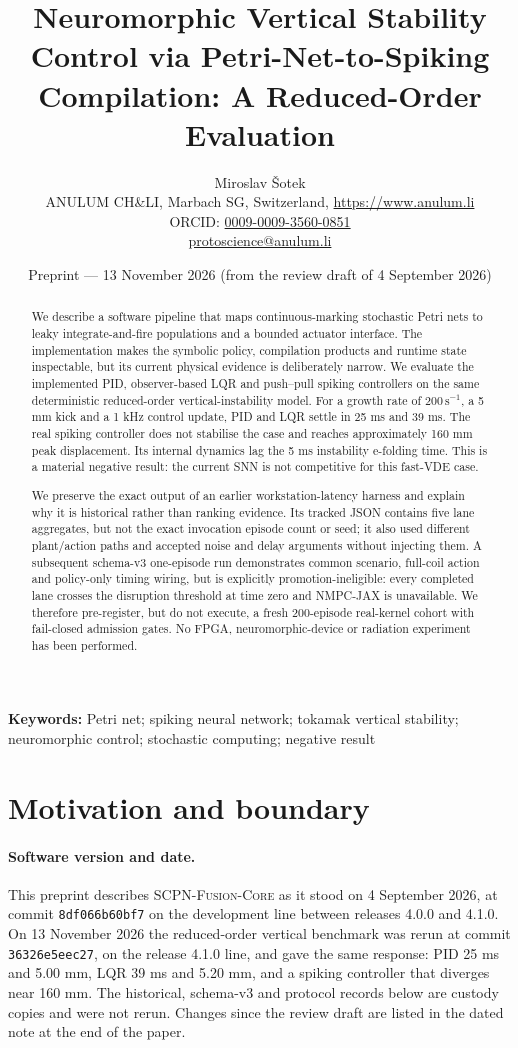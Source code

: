 \documentclass[11pt]{article}
\title{Neuromorphic Vertical Stability Control via Petri-Net-to-Spiking\\
Compilation: A Reduced-Order Evaluation}
\author{Miroslav \v{S}otek\\
\small ANULUM CH\&LI, Marbach SG, Switzerland, \url{https://www.anulum.li}\\
\small ORCID: \href{https://orcid.org/0009-0009-3560-0851}{0009-0009-3560-0851}\\
\small \href{mailto:protoscience@anulum.li}{protoscience@anulum.li}}
\date{Preprint --- 13 November 2026 (from the review draft of 4 September 2026)}
\newcommand{\code}[1]{\texttt{#1}}
\newcommand{\scpn}{\textsc{SCPN-Fusion-Core}}
\begin{document}
\maketitle

\begin{abstract}
We describe a software pipeline that maps continuous-marking stochastic Petri
nets to leaky integrate-and-fire populations and a bounded actuator interface.
The implementation makes the symbolic policy, compilation products and runtime
state inspectable, but its current physical evidence is deliberately narrow.  We
evaluate the implemented PID, observer-based LQR and push--pull spiking
controllers on the same deterministic reduced-order vertical-instability model.
For a growth rate of $200\,\mathrm{s}^{-1}$, a 5 mm kick and a 1 kHz control
update, PID and LQR settle in 25 ms and 39 ms.  The real spiking controller does
not stabilise the case and reaches approximately 160 mm peak displacement.  Its
internal dynamics lag the 5 ms instability e-folding time.  This is a material
negative result: the current SNN is not competitive for this fast-VDE case.

We preserve the exact output of an earlier workstation-latency harness and
explain why it is historical rather than ranking evidence.  Its tracked JSON
contains five lane aggregates, but not the exact invocation episode count or
seed; it also used different plant/action paths and accepted noise and delay
arguments without injecting them.  A subsequent schema-v3 one-episode run
demonstrates common scenario, full-coil action and policy-only timing wiring,
but is explicitly promotion-ineligible: every completed lane crosses the
disruption threshold at time zero and NMPC-JAX is unavailable.  We therefore
pre-register, but do not execute, a fresh 200-episode real-kernel cohort with
fail-closed admission gates.  No FPGA, neuromorphic-device or radiation
experiment has been performed.
\end{abstract}

\noindent\textbf{Keywords:} Petri net; spiking neural network; tokamak
vertical stability; neuromorphic control; stochastic computing; negative result

\section{Motivation and boundary}

\paragraph{Software version and date.} This preprint describes \scpn{} as
it stood on 4 September 2026, at commit \code{8df066b60bf7} on the
development line between releases 4.0.0 and 4.1.0.  On 13 November 2026 the reduced-order
vertical benchmark was rerun at commit \code{36326e5eec27}, on the release
4.1.0 line, and gave the same response: PID 25 ms and 5.00 mm, LQR
39 ms and 5.20 mm, and a spiking controller that diverges near 160 mm.  The
historical, schema-v3 and protocol records below are custody copies and were
not rerun.  Changes since the review draft are listed in the dated note at
the end of the paper.
\end{document}
